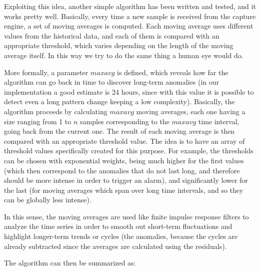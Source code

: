\documentclass[12pt,a4paper,cucitura]{toptesi}
\begin{document}

Exploiting this idea, another simple algorithm has been written and tested, and it works pretty well. Basically, every time a new sample is received from the capture engine, a set of moving averages is computed. Each moving average uses different values from the historical data, and each of them is compared with an appropriate threshold, which varies depending on the length of the moving average itself. In this way we try to do the same thing a human eye would do.

More formally, a parameter $maxavg$ is defined, which reveals how far the algorithm can go back in time to discover long-term anomalies (in our implementation a good estimate is 24 hours, since with this value it is possible to detect even a long pattern change keeping a low complexity). Basically, the algorithm proceeds by calculating $maxavg$ moving averages, each one having a size ranging from 1 to $n$ samples corresponding to the $maxavg$ time interval, going back from the current one. 
The result of each moving average is then compared with an appropriate threshold value.
The idea is to have an array of threshold values specifically created for this purpose. For example, the thresholds can be chosen with exponential weights, being much higher for the first values (which then correspond to the anomalies that do not last long, and therefore should be more intense in order to trigger an alarm), and significantly lower for the last (for moving averages which span over long time intervals, and so they can be globally less intense).

In this sense, the moving averages are used like finite impulse response filters to analyze the time series in order to smooth out short-term fluctuations and highlight longer-term trends or cycles (the anomalies, because the cycles are already subtracted since the averages are calculated using the residuals).

The algorithm can then be summarized as:
\end{document}
